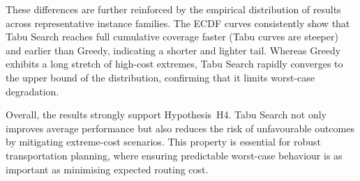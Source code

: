 These differences are further reinforced by the empirical distribution of results across representative instance families. The ECDF curves consistently show that Tabu Search reaches full cumulative coverage faster (Tabu curves are steeper) and earlier than Greedy, indicating a shorter and lighter tail. Whereas Greedy exhibits a long stretch of high-cost extremes, Tabu Search rapidly converges to the upper bound of the distribution, confirming that it limits worst-case degradation.

Overall, the results strongly support Hypothesis~H4. Tabu Search not only improves average performance but also reduces the risk of unfavourable outcomes by mitigating extreme-cost scenarios. This property is essential for robust transportation planning, where ensuring predictable worst-case behaviour is as important as minimising expected routing cost.
